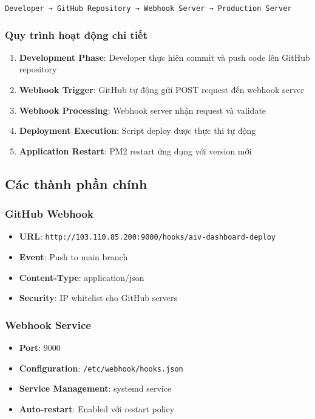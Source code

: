 \documentclass[12pt,a4paper]{article}
\begin{document}
\begin{center}
\texttt{Developer → GitHub Repository → Webhook Server → Production Server}
\end{center}

\subsubsection{Quy trình hoạt động chi tiết}

\begin{enumerate}
    \item \textbf{Development Phase}: Developer thực hiện commit và push code lên GitHub repository
    \item \textbf{Webhook Trigger}: GitHub tự động gửi POST request đến webhook server
    \item \textbf{Webhook Processing}: Webhook server nhận request và validate
    \item \textbf{Deployment Execution}: Script deploy được thực thi tự động
    \item \textbf{Application Restart}: PM2 restart ứng dụng với version mới
\end{enumerate}

\subsection{Các thành phần chính}

\subsubsection{GitHub Webhook}
\begin{itemize}
    \item \textbf{URL}: \texttt{http://103.110.85.200:9000/hooks/aiv-dashboard-deploy}
    \item \textbf{Event}: Push to main branch
    \item \textbf{Content-Type}: application/json
    \item \textbf{Security}: IP whitelist cho GitHub servers
\end{itemize}

\subsubsection{Webhook Service}
\begin{itemize}
    \item \textbf{Port}: 9000
    \item \textbf{Configuration}: \texttt{/etc/webhook/hooks.json}
    \item \textbf{Service Management}: systemd service
    \item \textbf{Auto-restart}: Enabled với restart policy
\end{itemize}
\end{document}
